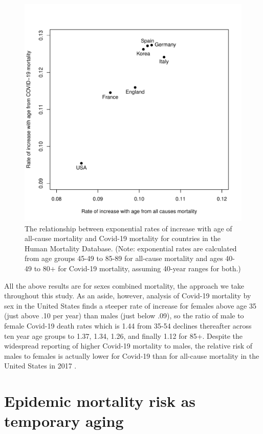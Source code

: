\documentclass[9pt,twocolumn,twoside,lineno]{pnas-new}
\begin{document}
\begin{figure}[h]%
\centering
\includegraphics[width=.8\linewidth]{./fig2_gompertz_scatter}
\caption{The relationship between exponential rates of increase with age of
  all-cause mortality and Covid-19 mortality for countries in the
  Human Mortality Database. (Note: exponential rates are calculated
  from age groups 45-49 to 85-89 for all-cause mortality and ages
  40-49 to 80$+$ for Covid-19 mortality, assuming 40-year ranges for
  both.)}
\label{fig:gompertz}
\end{figure}



All the above results are for sexes combined mortality, the approach
we take throughout this study. As an aside, however, analysis of
Covid-19 mortality by sex in the United States finds a steeper rate of
increase for females above age 35 (just above .10 per year) than males
(just below .09), so the ratio of male to female Covid-19 death rates
which is 1.44 from 35-54 declines thereafter across ten year age
groups to 1.37, 1.34, 1.26, and finally 1.12 for 85+. Despite the
widespread reporting of higher Covid-19 mortality to males, the
relative risk of males to females is actually lower for Covid-19 than
for all-cause mortality in the United States in 2017 \cite{HMD}.  

\section*{Epidemic mortality risk as temporary aging}
\end{document}
